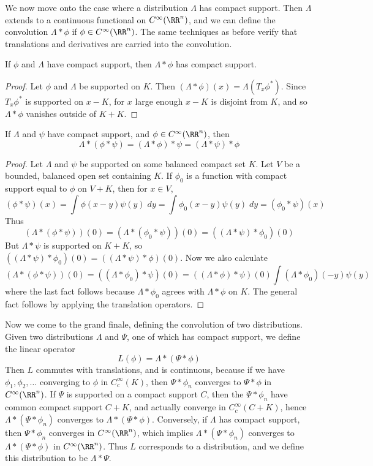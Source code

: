 We now move onto the case where a distribution $\Lambda$ has compact support. Then $\Lambda$ extends to a continuous functional on $C^\infty(\RR^n)$, and we can define the convolution $\Lambda * \phi$ if $\phi \in C^\infty(\RR^n)$. The same techniques as before verify that translations and derivatives are carried into the convolution.

\begin{theorem}
    If $\phi$ and $\Lambda$ have compact support, then $\Lambda * \phi$ has compact support.
\end{theorem}
\begin{proof}
    Let $\phi$ and $\Lambda$ be supported on $K$. Then $(\Lambda * \phi)(x) = \Lambda(T_x \phi^*)$. Since $T_x \phi^*$ is supported on $x - K$, for $x$ large enough $x-K$ is disjoint from $K$, and so $\Lambda * \phi$ vanishes outside of $K + K$.
\end{proof}

\begin{theorem}
    If $\Lambda$ and $\psi$ have compact support, and $\phi \in C^\infty(\RR^n)$, then
    \[ \Lambda * (\phi * \psi) = (\Lambda * \phi) * \psi = (\Lambda * \psi) * \phi \]
\end{theorem}
\begin{proof}
    Let $\Lambda$ and $\psi$ be supported on some balanced compact set $K$. Let $V$ be a bounded, balanced open set containing $K$. If $\phi_0$ is a function with compact support equal to $\phi$ on $V + K$, then for $x \in V$,
    \[ (\phi * \psi)(x) = \int \phi(x - y) \psi(y)\; dy = \int \phi_0(x - y) \psi(y)\; dy = (\phi_0 * \psi)(x) \]
    Thus
    \[ (\Lambda * (\phi * \psi))(0) = (\Lambda * (\phi_0 * \psi))(0) = ((\Lambda * \psi) * \phi_0)(0) \]
    But $\Lambda * \psi$ is supported on $K + K$, so $((\Lambda * \psi) * \phi_0)(0) = ((\Lambda * \psi) * \phi)(0)$. Now we also calculate
    \[ (\Lambda * (\phi * \psi))(0) = ((\Lambda * \phi_0) * \psi)(0) = ((\Lambda * \phi) * \psi)(0) \int (\Lambda * \phi_0)(-y) \psi(y) \]
    where the last fact follows because $\Lambda * \phi_0$ agrees with $\Lambda * \phi$ on $K$. The general fact follows by applying the translation operators.
\end{proof}

Now we come to the grand finale, defining the convolution of two distributions. Given two distributions $\Lambda$ and $\Psi$, one of which has compact support, we define the linear operator
%
\[ L(\phi) = \Lambda * (\Psi * \phi) \]
%
Then $L$ commutes with translations, and is continuous, because if we have $\phi_1, \phi_2, \dots$ converging to $\phi$ in $C_c^\infty(K)$, then $\Psi * \phi_n$ converges to $\Psi * \phi$ in $C^\infty(\RR^n)$. If $\Psi$ is supported on a compact support $C$, then the $\Psi * \phi_n$ have common compact support $C + K$, and actually converge in $C_c^\infty(C + K)$, hence $\Lambda * (\Psi * \phi_n)$ converges to $\Lambda * (\Psi * \phi)$. Conversely, if $\Lambda$ has compact support, then $\Psi * \phi_n$ converges in $C^\infty(\RR^n)$, which implies $\Lambda * (\Psi * \phi_n)$ converges to $\Lambda * (\Psi * \phi)$ in $C^\infty(\RR^n)$. Thus $L$ corresponds to a distribution, and we define this distribution to be $\Lambda * \Psi$.

